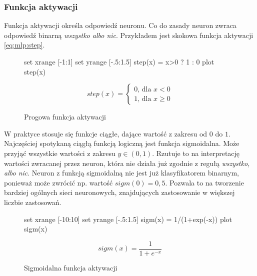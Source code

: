 \documentclass[a4paper,12pt,twoside,openany]{report}
\begin{document}
\begin{enumerate}
\subsubsection{Funkcja aktywacji}
Funkcja aktywacji określa odpowiedź neuronu.
Co do zasady neuron zwraca odpowiedź binarną \textit{wszystko albo nic}.
Przykładem jest skokowa funkcja aktywacji \ref{eq:mlp:step}.
\begin{figure}[h]
	\label{wyk:mlp:step}
	\centering
	\begin{gnuplot}[terminal=pdf,terminaloptions=color]
		set xrange [-1:1] 
		set yrange [-.5:1.5]
		step(x) = x>0 ? 1 : 0
		plot step(x)
	\end{gnuplot}
	\begin{equation}
		step(x)={\begin{cases}0{\text{, dla }}x<0\\1{\text{, dla }}x\geq 0\end{cases}}
	\end{equation}
	\caption{Progowa funkcja aktywacji}
\end{figure}

W praktyce stosuje się funkcje ciągłe, dające wartość z zakresu od $0$ do $1$.
Najczęściej spotykaną ciągłą funkcją logiczną jest funkcja sigmoidalna.
Może przyjąć wszystkie wartości z zakresu $y \in (0,1)$.
Rzutuje to na interpretację wartości zwracanej przez neuron,
która nie działa już zgodnie z regułą \textit{wszystko, albo nic}.
Neuron z funkcją sigmoidalną nie jest już klasyfikatorem binarnym, ponieważ może zwrócić np. wartość $sigm(0) = 0,5$.
Pozwala to na tworzenie bardziej ogólnych sieci neuronowych, znajdujących zastosowanie w większej liczbie zastosowań.


\begin{figure}[h]
	\label{wyk:mlp:sigm}
	\centering
	\begin{gnuplot}[terminal=pdf,terminaloptions=color]
		set xrange [-10:10] 
		set yrange [-.5:1.5]
		sigm(x) = 1/(1+exp(-x))
		plot sigm(x)
	\end{gnuplot}
	\begin{equation}
		sigm(x)=\frac{1}{1+e^{-x}}
	\end{equation}
	\caption{Sigmoidalna funkcja aktywacji}
\end{figure}

\end{enumerate}
\end{document}
